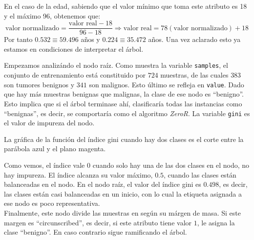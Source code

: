 \documentclass[a4]{article}
\begin{document}
En el caso de la edad, sabiendo que el valor mínimo que toma este atributo es 18 y el máximo 96, obtenemos que: $$\text{valor normalizado} = \frac{\text{valor real} - 18}{96 - 18} \Rightarrow \text{valor real} = 78(\text{valor normalizado}) + 18$$ Por tanto $0.532 \equiv 59.496$ años y $0.224 \equiv 35.472$ años. Una vez aclarado esto ya estamos en condiciones de interpretar el árbol.

Empezamos analizándo el nodo raíz. Como muestra la variable \texttt{samples}, el conjunto de entrenamiento está constituido por $724$ muestras, de las cuales $383$ son tumores benignos y $341$ son malignos. Esto último se refleja en \texttt{value}. Dado que hay más muestras benignas que malignas, la clase de ese nodo es ``benigno''. Esto implica que si el árbol terminase ahí, clasificaría todas las instancias como ``benignas'', es decir, se comportaría como el algoritmo \textit{ZeroR}. La variable \texttt{gini} es el valor de impureza del nodo.

La gráfica de la función del índice gini cuando hay dos clases es el corte entre la parábola azul y el plano magenta.

\begin{figure}[H]
  \centering
\end{figure}

Como vemos, el índice vale $0$ cuando solo hay una de las dos clases en el nodo, no hay impureza. El índice alcanza su valor máximo, $0.5$, cuando las clases están balanceadas en el nodo.  En el nodo raíz, el valor del índice gini es $0.498$, es decir, las clases están casi balanceadas en un inicio, con lo cual la etiqueta asignada a ese nodo es poco representativa.\\
Finalmente, este nodo divide las muestras en según su márgen de masa. Si este margen es ``circunscribed'', es decir, si este atributo tiene valor $1$, le asigna la clase ``benigno''. En caso contrario sigue ramificando el árbol.
\end{document}
